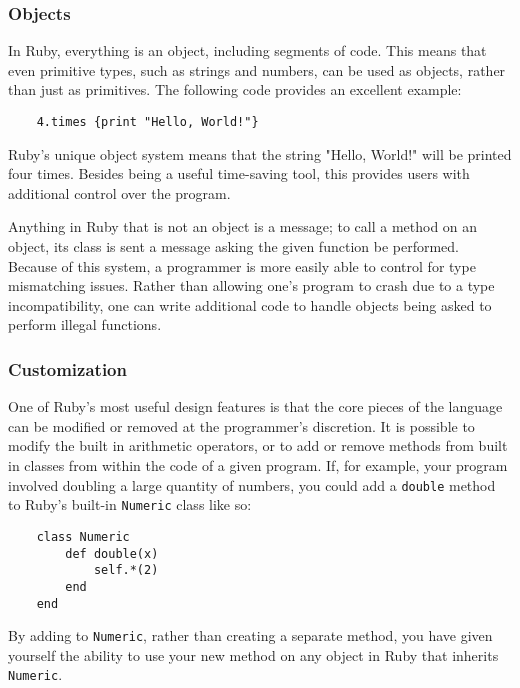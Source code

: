 \documentclass[12pt]{article}
\begin{document}
\subsubsection{Objects}
In Ruby, everything is an object, including segments of code\cite{generalRb}. This means that even primitive types, such as strings and numbers, can be used as objects, rather than just as primitives. The following code provides an excellent example:
\begin{lstlisting}
	4.times {print "Hello, World!"}
\end{lstlisting}
Ruby's unique object system means that the string "Hello, World!" will be printed four times. Besides being a useful time-saving tool, this provides users with additional control over the program.

Anything in Ruby that is not an object is a message; to call a method on an object, its class is sent a message asking the given function be performed. Because of this system, a programmer is more easily able to control for type mismatching issues. Rather than allowing one's program to crash due to a type incompatibility, one can write additional code to handle objects being asked to perform illegal functions.

\subsubsection{Customization}
One of Ruby's most useful design features is that the core pieces of the language can be modified or removed at the programmer's discretion. It is possible to modify the built in arithmetic operators, or to add or remove methods from built in classes from within the code of a given program. If, for example, your program involved doubling a large quantity of numbers, you could add a \verb|double| method to Ruby's built-in \verb|Numeric| class like so:
\begin{lstlisting}
    class Numeric
        def double(x)
            self.*(2)
        end
    end
\end{lstlisting}
By adding to \verb|Numeric|, rather than creating a separate method, you have given yourself the ability to use your new method on any object in Ruby that inherits \verb|Numeric|.
\end{document}
